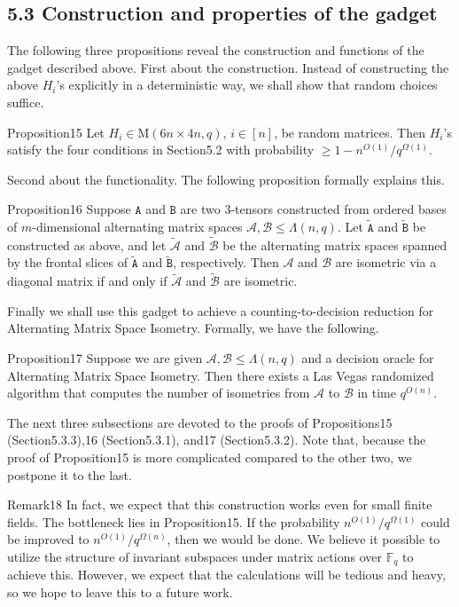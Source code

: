 \subsection*{5.3 Construction and properties of the gadget}
The following three propositions reveal the construction and functions of the gadget described above. First about the construction. Instead of constructing the above $H_i$'s explicitly in a deterministic way, we shall show that random choices suffice.
\begin{authorclaim}{Proposition15}
Let $H_i\in\mathrm M(6n\times4n,q)$, $i\in[n]$, be random matrices. Then $H_i$'s satisfy the four conditions in Section5.2 with probability $\ge1-n^{O(1)}/q^{\Omega(1)}$.
\end{authorclaim}
Second about the functionality. The following proposition formally explains this.
\begin{authorclaim}{Proposition16}
Suppose $\mathtt A$ and $\mathtt B$ are two 3-tensors constructed from ordered bases of $m$-dimensional alternating matrix spaces $\mathcal A,\mathcal B\le\Lambda(n,q)$. Let $\widetilde{\mathtt A}$ and $\widetilde{\mathtt B}$ be constructed as above, and let $\widetilde{\mathcal A}$ and $\widetilde{\mathcal B}$ be the alternating matrix spaces spanned by the frontal slices of $\widetilde{\mathtt A}$ and $\widetilde{\mathtt B}$, respectively. Then $\mathcal A$ and $\mathcal B$ are isometric via a diagonal matrix if and only if $\widetilde{\mathcal A}$ and $\widetilde{\mathcal B}$ are isometric.
\end{authorclaim}
Finally we shall use this gadget to achieve a counting-to-decision reduction for Alternating Matrix Space Isometry. Formally, we have the following.
\begin{authorclaim}{Proposition17}
Suppose we are given $\mathcal A,\mathcal B\le\Lambda(n,q)$ and a decision oracle for Alternating Matrix Space Isometry. Then there exists a Las Vegas randomized algorithm that computes the number of isometries from $\mathcal A$ to $\mathcal B$ in time $q^{O(n)}$.
\end{authorclaim}
The next three subsections are devoted to the proofs of Propositions15 (Section5.3.3),16 (Section5.3.1), and17 (Section5.3.2). Note that, because the proof of Proposition15 is more complicated compared to the other two, we postpone it to the last.
\begin{authorclaim}{Remark18}
In fact, we expect that this construction works even for small finite fields. The bottleneck lies in Proposition15. If the probability $n^{O(1)}/q^{\Omega(1)}$ could be improved to $n^{O(1)}/q^{\Omega(n)}$, then we would be done. We believe it possible to utilize the structure of invariant subspaces under matrix actions over $\mathbb F_q$ to achieve this. However, we expect that the calculations will be tedious and heavy, so we hope to leave this to a future work.
\end{authorclaim}
